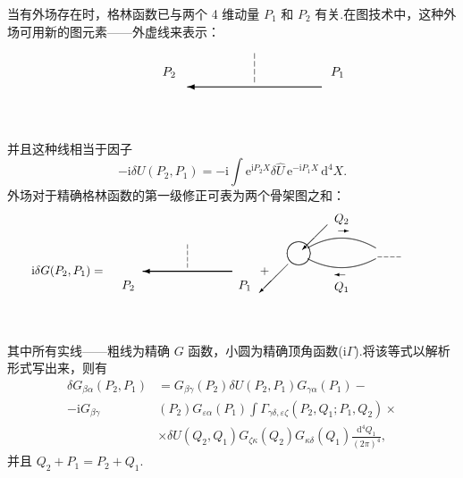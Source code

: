 当有外场存在时，格林函数已与两个 4 维动量 $P_1$ 和 $P_2$ 有关.在图技术中，这种外场可用新的图元素——外虚线来表示：
\begin{equation*}
  \setlength{\unitlength}{0.90pt}%
  \begin{picture}(240,70)(0,0)
    \tarrL{200}{35}{120}%
    \dvh{140}{39}{4}%
    \put(64,48){\makebox(0,0){$P_2$}}%
    \put(214,48){\makebox(0,0){$P_1$}}%
  \end{picture}
\end{equation*}
并且这种线相当于因子
\begin{equation}
  -\mathrm{i}\delta U(P_2,P_1)=-\mathrm{i}\int\mathrm{e}^{\mathrm{i}P_2X}\delta\hat{U}\,\mathrm{e}^{-\mathrm{i}P_1X}\,\mathrm{d}^4X.
\end{equation}
外场对于精确格林函数的第一级修正可表为两个骨架图之和：
\begin{equation}
  \setlength{\unitlength}{0.75pt}%
  \begin{picture}(500,130)(0,0)
    \put(66,64){\makebox(0,0){$\mathrm{i}\delta G(P_2,P_1)=$}}%
    \tarrL{250}{64}{100}%
    \dvh{200}{68}{4}%
    \put(134,48){\makebox(0,0){$P_2$}}%
    \put(264,48){\makebox(0,0){$P_1$}}%
    \put(286,64){\makebox(0,0){$+$}}%
    \put(356,116){\vector(-1,-1){28}}%
    \qbezier(324,71)(335.882,72.118)(337,84)%
    \qbezier(337,84)(335.882,95.882)(324,97)%
    \qbezier(324,97)(312.118,95.882)(311,84)%
    \qbezier(311,84)(312.118,72.118)(324,71)%
    \put(312,72){\vector(-1,-1){32}}%
    \qbezier(334,90)(372,112)(410,90)%
    \qbezier(334,78)(372,58)(410,78)%
    \put(368,109){\vector(1,0){12}}%
    \put(376,60){\vector(-1,0){12}}%
    \put(372,122){\makebox(0,0){$Q_2$}}%
    \put(372,46){\makebox(0,0){$Q_1$}}%
    \multiput(412,80)(7,0){4}{\line(1,0){5}}%
  \end{picture}
\end{equation}
其中所有实线——粗线为精确 $G$ 函数，小圆为精确顶角函数($\mathrm{i}\Gamma$).将该等式以解析形式写出来，则有
\begin{equation}
\begin{aligned}
  \delta G_{\beta\alpha}(P_2,P_1)&=G_{\beta\gamma}(P_2)\delta U(P_2,P_1)G_{\gamma\alpha}(P_1)-\\
  -\mathrm{i}G_{\beta\gamma}&(P_2)G_{\varepsilon\alpha}(P_1)\int\Gamma_{\gamma\delta,\varepsilon\zeta}(P_2,Q_1;P_1,Q_2)\times\\
  &\times\delta U(Q_2,Q_1)G_{\zeta\kappa}(Q_2)G_{\kappa\delta}(Q_1)\frac{\mathrm{d}^4Q_1}{(2\pi)^4},
\end{aligned}
\end{equation}
并且 $Q_2+P_1=P_2+Q_1$.

